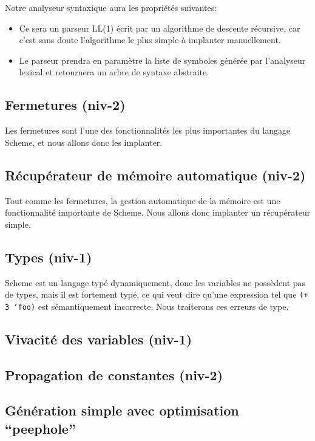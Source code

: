 \documentclass[11pt]{article}
\begin{document}
Notre analyseur syntaxique aura les propriétés suivantes:

\begin{itemize}
\item Ce sera un parseur LL(1) écrit par un algorithme de descente
  récursive, car c'est sans doute l'algorithme le plus simple à
  implanter manuellement.
\item Le parseur prendra en paramètre la liste de symboles générée par
  l'analyseur lexical et retournera un arbre de syntaxe abstraite.
\end{itemize}



\subsection{Fermetures (niv-2)}

Les fermetures sont l'une des fonctionnalités les plus importantes du
langage Scheme, et nous allons donc les implanter.

\subsection{Récupérateur de mémoire automatique (niv-2)}

Tout comme les fermetures, la gestion automatique de la mémoire est
une fonctionnalité importante de Scheme.  Nous allons donc implanter
un récupérateur simple.

\subsection{Types (niv-1)}

Scheme est un langage typé dynamiquement, donc les variables ne
possèdent pas de types, mais il est fortement typé, ce qui veut dire
qu'une expression tel que \texttt{(+ 3 'foo)} est sémantiquement
incorrecte.  Nous traiterons ces erreurs de type.

\subsection{Vivacité des variables (niv-1)}

\subsection{Propagation de constantes (niv-2)}

\subsection{Génération simple avec optimisation ``peephole''}
\end{document}
